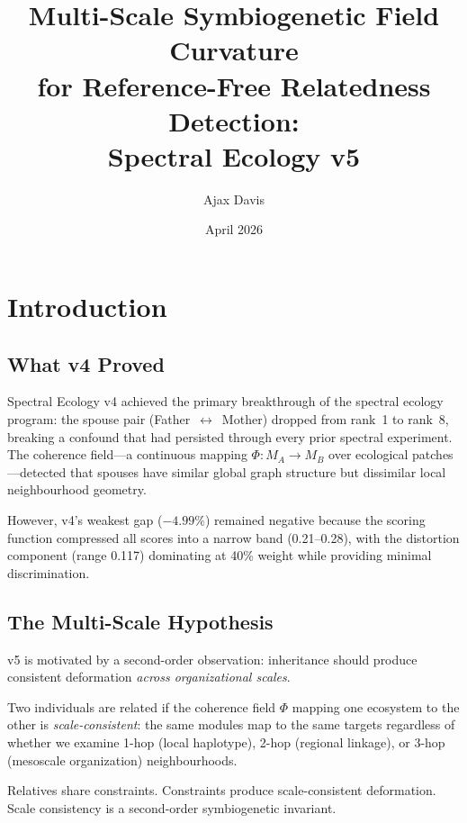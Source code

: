 \documentclass{../yalumba}
\title{Multi-Scale Symbiogenetic Field Curvature\\for Reference-Free Relatedness Detection:\\Spectral Ecology v5}
\author{Ajax Davis}
\date{April 2026}
\begin{document}
\maketitle

\tableofcontents
\newpage


\section{Introduction}
\label{sec:intro}

\subsection{What v4 Proved}

Spectral Ecology v4 achieved the primary breakthrough of the spectral ecology
program: the spouse pair (Father~$\leftrightarrow$~Mother) dropped from
rank~1 to rank~8, breaking a confound that had persisted through every prior
spectral experiment.  The coherence field---a continuous mapping
$\Phi: M_A \to M_B$ over ecological patches---detected that spouses have
similar global graph structure but dissimilar local neighbourhood geometry.


However, v4's weakest gap ($-4.99\%$) remained negative because the scoring
function compressed all scores into a narrow band (0.21--0.28), with the
distortion component (range 0.117) dominating at 40\% weight while providing
minimal discrimination.

\subsection{The Multi-Scale Hypothesis}

v5 is motivated by a second-order observation: inheritance should produce
consistent deformation \emph{across organizational scales}.

\begin{definition}
Two individuals are related if the coherence field $\Phi$ mapping one
ecosystem to the other is \emph{scale-consistent}: the same modules map
to the same targets regardless of whether we examine 1-hop (local
haplotype), 2-hop (regional linkage), or 3-hop (mesoscale organization)
neighbourhoods.
\end{definition}

\begin{pullquote}
Relatives share constraints.  Constraints produce scale-consistent
deformation.  Scale consistency is a second-order symbiogenetic invariant.
\end{pullquote}
\end{document}
